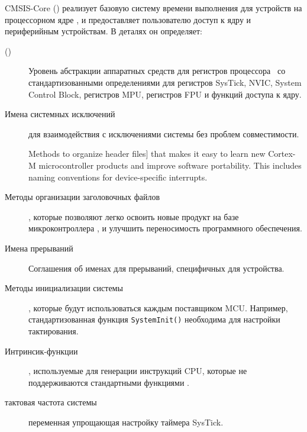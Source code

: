 \pagebreak
{}

CMSIS-Core (\cm{}) реализует базовую систему времени выполнения для устройств на
процессорном ядре \cm{}, и предоставляет пользователю доступ к ядру и
периферийным устройствам. В деталях он определяет:

\begin{description}

\item[ ()] Уровень абстракции
аппаратных средств для регистров процессора \cm{}\ со стандартизованными
определениями для регистров SysTick, NVIC, System Control Block, регистров MPU,
регистров FPU и функций доступа к ядру.

\item[Имена системных исключений] для взаимодействия с исключениями системы без
проблем совместимости.

Methods to organize header files] that makes it easy to learn new Cortex-M
microcontroller products and improve software portability. This includes naming
conventions for device-specific interrupts.

\item[Методы организации заголовочных файлов], которые позволяют легко освоить
новые продукт на базе микроконтроллера \cm{}, и улучшить переносимость
программного обеспечения.

\item[Имена прерываний] Соглашения об именах для прерываний,
специфичных для устройства.

\item[Методы инициализации системы], которые будут использоваться каждым
поставщиком MCU. Например, стандартизованная функция \verb|SystemInit()|
необходима для настройки тактирования.

\item[Интринсик-функции], используемые для генерации инструкций CPU, которые не
поддерживаются стан\-дарт\-ны\-ми функциями \purec.

\item[тактовая частота системы] переменная упрощающая настройку таймера
SysTick.

\end{description}